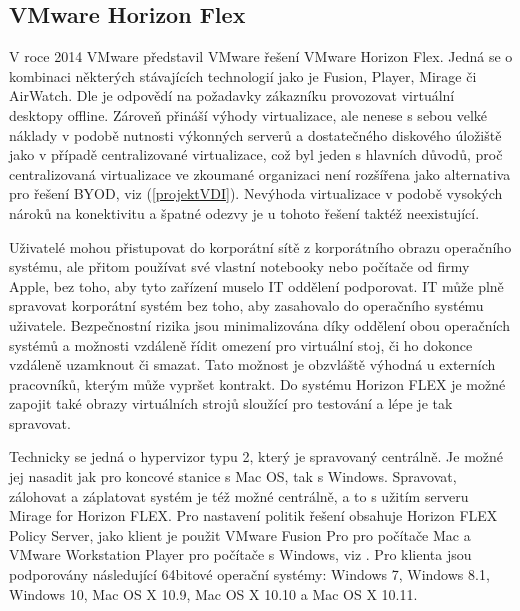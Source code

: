 \subsection{VMware Horizon Flex}
V roce 2014 VMware představil VMware řešení VMware Horizon Flex. Jedná se o kombinaci některých stávajících technologií jako je Fusion, Player, Mirage či AirWatch. Dle \cite{GartnerFlex} je odpovědí na požadavky zákazníku provozovat virtuální desktopy offline. Zároveň přináší výhody virtualizace, ale nenese s sebou velké náklady v podobě nutnosti výkonných serverů a dostatečného diskového úložiště jako v případě centralizované virtualizace, což byl jeden s hlavních důvodů, proč centralizovaná virtualizace ve zkoumané organizaci není rozšířena jako alternativa pro řešení BYOD, viz (\ref{projektVDI}). Nevýhoda virtualizace v podobě vysokých nároků na konektivitu a špatné odezvy je u tohoto řešení taktéž neexistující. 

Uživatelé mohou přistupovat do korporátní sítě z korporátního obrazu operačního systému, ale přitom používat své vlastní notebooky nebo počítače od firmy Apple, bez toho, aby tyto zařízení muselo IT oddělení podporovat. IT může plně spravovat korporátní systém bez toho, aby zasahovalo do operačního systému uživatele. Bezpečnostní rizika jsou minimalizována díky oddělení obou operačních systémů a možnosti vzdáleně řídit omezení pro virtuální stoj, či ho dokonce vzdáleně uzamknout či smazat. Tato možnost je obzvláště výhodná u externích pracovníků, kterým může vypršet kontrakt. Do systému Horizon FLEX je možné zapojit také obrazy virtuálních strojů sloužící pro testování a lépe je tak spravovat.

Technicky se jedná o hypervizor typu 2, který je spravovaný centrálně. Je možné jej nasadit jak pro koncové stanice s Mac OS, tak s Windows. Spravovat, zálohovat a záplatovat systém je též možné centrálně, a to s užitím serveru Mirage for Horizon FLEX. Pro nastavení politik řešení obsahuje Horizon FLEX Policy Server, jako klient je použit VMware Fusion Pro pro počítače Mac a VMware Workstation Player pro počítače s Windows, viz \cite{FlexBrief}. %
Pro klienta jsou podporovány následující 64bitové operační systémy: Windows 7, Windows 8.1, Windows 10, Mac OS X 10.9, Mac OS X 10.10 a Mac OS X 10.11.

